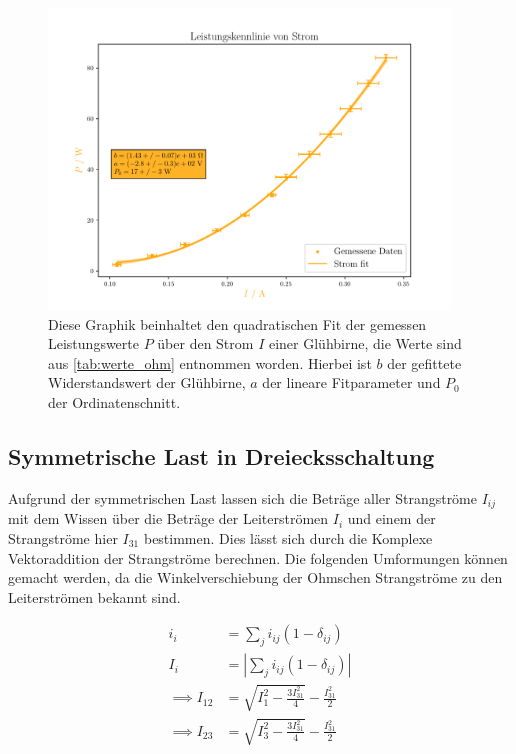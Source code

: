 \documentclass[12pt,english,ngerman]{scrartcl}
\begin{document}
\begin{figure}[H]
	\begin{center}
		\includegraphics[width = 0.95\textwidth]{figures/pIkennlinie.pdf}
	\end{center}
	\caption[Stromabhängige Leistungskurve einer Glühbirne]{Diese Graphik beinhaltet den
		quadratischen Fit der gemessen Leistungswerte $P$ über den Strom $I$ einer
		Glühbirne, die Werte sind aus \autoref{tab:werte_ohm} entnommen worden. Hierbei
		ist $b$ der gefittete Widerstandswert der Glühbirne, $a$ der lineare
		Fitparameter und $P_0$ der Ordinatenschnitt.
	}\label{fig:pIkennlinie}
\end{figure}

\subsection{Symmetrische Last in Dreiecksschaltung}\label{sec:ausw_dreieck}

Aufgrund der symmetrischen Last lassen sich die Beträge aller Strangströme
$I_{ij}$ mit dem Wissen über die Beträge der Leiterströmen $I_i$ und einem der
Strangströme hier $I_{31}$ bestimmen. Dies lässt sich durch die Komplexe
Vektoraddition der Strangströme berechnen. Die folgenden Umformungen können
gemacht werden, da die Winkelverschiebung der Ohmschen Strangströme zu den
Leiterströmen bekannt sind.

\begin{align}
	i_{i}           & = \sum_{j} i_{ij} (1-\delta_{ij})                                                    \\
	I_{i}           & = |\sum_{j} i_{ij} (1-\delta_{ij})|                                                  \\
	\implies I_{12} & = \sqrt{I_1^2-\frac{3I_{31}^2}{4}}-\frac{I_{31}^2}{2}                                \\
	\implies I_{23} & = \sqrt{I_3^2-\frac{3I_{31}^2}{4}}-\frac{I_{31}^2}{2}\label{eq:complexstromaddition}
\end{align}
\end{document}
